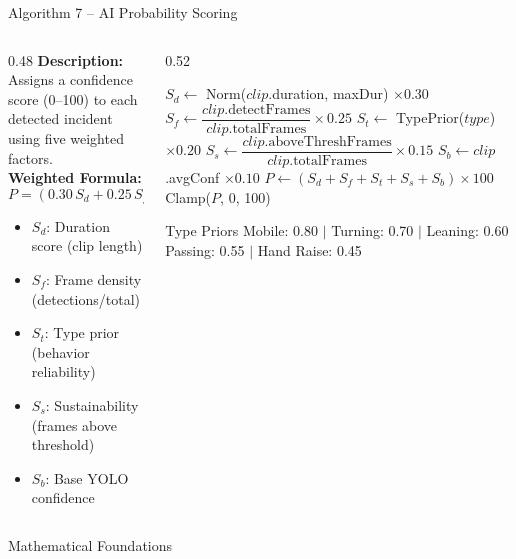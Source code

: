 \documentclass{beamer}
\begin{document}
\begin{frame}{Algorithm 7 -- AI Probability Scoring}
\begin{columns}
\begin{column}{0.48\textwidth}
\footnotesize
\textbf{Description:}\\
Assigns a confidence score (0--100) to each detected incident using five weighted factors.\\[0.2cm]
\textbf{Weighted Formula:}
\[
P = (0.30\,S_d + 0.25\,S_f + 0.20\,S_t + 0.15\,S_s + 0.10\,S_b)\times 100
\]
\begin{itemize}\scriptsize
    \item $S_d$: Duration score (clip length)
    \item $S_f$: Frame density (detections/total)
    \item $S_t$: Type prior (behavior reliability)
    \item $S_s$: Sustainability (frames above threshold)
    \item $S_b$: Base YOLO confidence
\end{itemize}
\end{column}
\begin{column}{0.52\textwidth}
\begin{algorithmic}[1]
\footnotesize
{}
  \State $S_d \gets$ Norm($clip$.duration, maxDur) $\times 0.30$
  \State $S_f \gets \dfrac{clip\text{.detectFrames}}{clip\text{.totalFrames}} \times 0.25$
  \State $S_t \gets$ TypePrior($type$) $\times 0.20$
  \State $S_s \gets \dfrac{clip\text{.aboveThreshFrames}}{clip\text{.totalFrames}} \times 0.15$
  \State $S_b \gets clip$.avgConf $\times 0.10$
  \State $P \gets (S_d+S_f+S_t+S_s+S_b)\times 100$
  \State \Return Clamp($P$, 0, 100)
\EndFunction
\end{algorithmic}
\vspace{0.2cm}
\begin{exampleblock}{\footnotesize Type Priors}
\scriptsize Mobile: 0.80 $\mid$ Turning: 0.70 $\mid$ Leaning: 0.60\\
Passing: 0.55 $\mid$ Hand Raise: 0.45
\end{exampleblock}
\end{column}
\end{columns}
\end{frame}

\begin{frame}{}
    \centering
    \Huge Mathematical Foundations
\end{frame}
\end{document}
